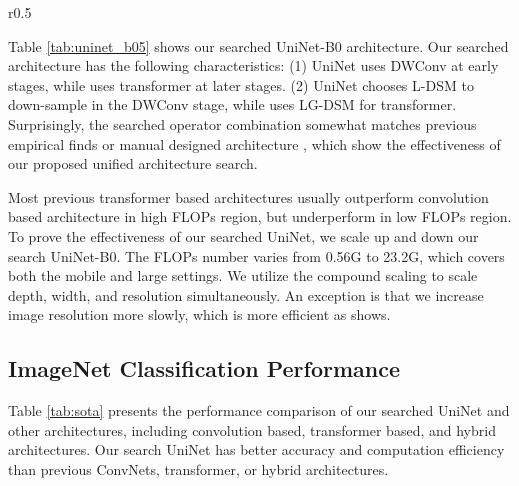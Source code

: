 \documentclass{article} \usepackage{iclr2022_conference,times}
\begin{document}
\begin{wraptable}{r}{0.5\textwidth}
\centering
    \vspace{-1em}
    \caption{UniNet-B0 architecture. GOP and DSM represent General Operators and down-sampling module respectively. DWConv and Transformer are are described in Section \ref{sec3.2}.}
    \vspace{-1em}
    \label{tab:uninet_b05}
\end{wraptable}

Table \ref{tab:uninet_b05} shows our searched UniNet-B0 architecture. Our searched architecture has the following characteristics: (1) UniNet uses DWConv at early stages, while uses transformer at later stages. (2) UniNet chooses L-DSM to down-sample in the DWConv stage, while uses LG-DSM for transformer.  Surprisingly, the searched operator combination somewhat matches previous empirical finds \citep{earlyconv} or manual designed architecture \citep{container}, which show the effectiveness of our proposed unified architecture search. 

Most previous transformer based architectures usually outperform convolution based architecture in high FLOPs region, but underperform in low FLOPs region.  To prove the effectiveness of our searched UniNet, we scale up and down our search UniNet-B0. The FLOPs number varies from 0.56G to 23.2G, which covers both the mobile and large settings. We utilize the compound scaling \citep{efficientnet} to scale depth, width, and resolution simultaneously. An exception is that we increase image resolution more slowly, which is more efficient as \citet{revisiting} shows.

\subsection{ImageNet Classification Performance}
Table \ref{tab:sota} presents the performance comparison of our searched UniNet and other architectures, including convolution based, transformer based, and hybrid architectures. Our search UniNet has better accuracy and computation efficiency than previous ConvNets, transformer, or hybrid architectures. 
\end{document}
